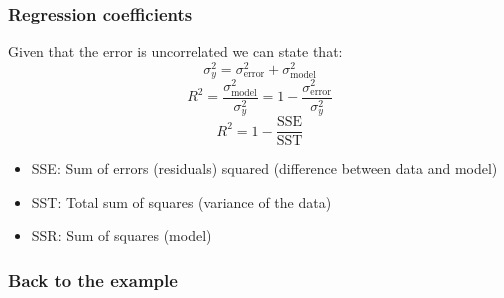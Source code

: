 \begin{frame}[fragile] 
  \frametitle{Regression coefficients}
  Given that the error is uncorrelated we can state that:
    \[
      \sigma^2_y = \sigma^2_\text{error}+\sigma^2_\text{model}
    \]
    \[
      R^2 = \frac{\sigma^2_\text{model}}{\sigma^2_y} = 1 - \frac{\sigma^2_\text{error}}{\sigma^2_y}
    \]
    \[
      R^2 = 1 - \frac{\text{SSE}}{\text{SST}}
    \]
    \begin{itemize}
      \item SSE: Sum of errors (residuals) squared (difference between data and model)
      \item SST: Total sum of squares (variance of the data)
      \item SSR: Sum of squares (model)
   \end{itemize}
\end{frame}


\begin{frame}[fragile] 
  \frametitle{Back to the example}
\end{frame}

